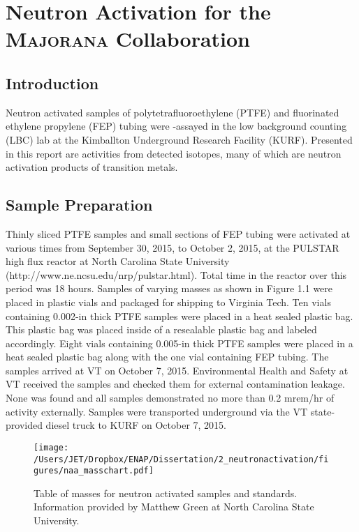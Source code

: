 \chapter{Neutron Activation for the \textsc{Majorana} Collaboration}
\section{Introduction}

Neutron activated samples of polytetrafluoroethylene (PTFE) and fluorinated ethylene propylene (FEP) tubing were \textgamma-assayed in the low background counting (LBC) lab at the Kimballton Underground Research Facility (KURF).  Presented in this report are activities from detected isotopes, many of which are neutron activation products of transition metals.

\section{Sample Preparation}

Thinly sliced PTFE samples and small sections of FEP tubing were activated at various times from September 30, 2015, to October 2, 2015, at the PULSTAR high flux reactor at North Carolina State University (http://www.ne.ncsu.edu/nrp/pulstar.html).  Total time in the reactor over this period was 18 hours.  Samples of varying masses as shown in Figure 1.1 were placed in plastic vials and packaged for shipping to Virginia Tech.  Ten vials containing 0.002-in thick PTFE samples were placed in a heat sealed plastic bag.  This plastic bag was placed inside of a resealable plastic bag and labeled accordingly.  Eight vials containing 0.005-in thick PTFE samples were placed in a heat sealed plastic bag along with the one vial containing FEP tubing.  The samples arrived at VT on October 7, 2015.  Environmental Health and Safety at VT received the samples and checked them for external contamination leakage.  None was found and all samples demonstrated no more than 0.2 mrem/hr of activity externally.  Samples were transported underground via the VT state-provided diesel truck to KURF on October 7, 2015.

\begin{figure}[htbp]
\centering
\texttt{[image: /Users/JET/Dropbox/ENAP/Dissertation/2\_neutronactivation/figures/naa\_masschart.pdf]}
\caption[%
Table of masses for neutron activated samples and standards.  
]{%
Table of masses for neutron activated samples and standards.  Information provided by Matthew Green at North Carolina State University.
\label{fig:mjd_cryostat}} 
\end{figure}

